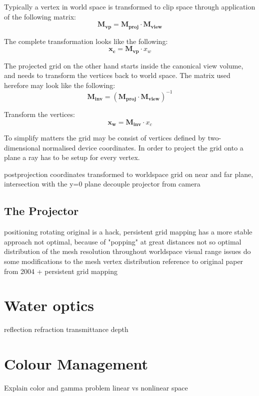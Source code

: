 Typically a vertex in world space is transformed to clip space through
application of the following matrix:
\begin{equation}
\label{ViewProjectionMatrix}
 \mathbf{M_{vp}} = \mathbf{M_{proj}} \cdot \mathbf{M_{view}}
\end{equation}

The complete transformation looks like the following:
\begin{equation}
\label{ViewProjectionMatrix}
 \mathbf{x_{c}} = \mathbf{M_{vp}} \cdot x_{w}
\end{equation}

The projected grid on the other hand starts inside the canonical view volume,
and needs to transform the vertices back to world space. The matrix used
herefore may look like the following:
\begin{equation}
 \mathbf{M_{inv}} = (\mathbf{M_{proj}} \cdot \mathbf{M_{view}})^{-1}
\end{equation}

Transform the vertices:
\begin{equation}
 \mathbf{x_{w}} = \mathbf{M_{inv}} \cdot x_{c}
\end{equation}


To simplify matters the grid may be consist of vertices defined by
two-dimensional normalised device coordinates. In order to project the grid
onto a plane a ray has to be setup for every vertex.

postprojection coordinates transformed to worldspace
grid on near and far plane, intersection with the y=0 plane
decouple projector from camera

\subsection{The Projector}
positioning
rotating
original is a hack, persistent grid mapping has a more stable approach
not optimal, because of "popping" at great distances
not so optimal distribution of the mesh resolution throughout worldspace
visual range issues
do some modifications to the mesh vertex distribution
reference to original paper from 2004 + persistent grid mapping

\section{Water optics}
reflection
refraction
transmittance
depth

\section{Colour Management}
Explain color and gamma problem
linear vs nonlinear space

